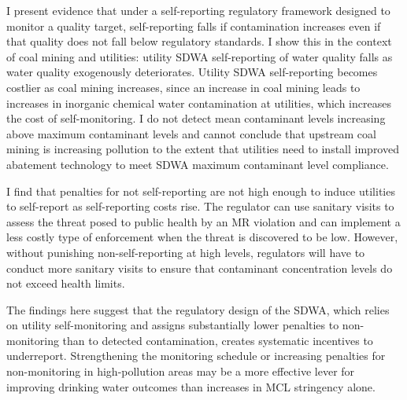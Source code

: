 \documentclass{article}
\begin{document}
I present evidence that under a self-reporting regulatory framework designed to monitor a quality target, self-reporting falls if contamination increases even if that quality does not fall below regulatory standards. I show this in the context of coal mining and utilities: utility SDWA self-reporting of water quality falls as water quality exogenously deteriorates. Utility SDWA self-reporting becomes costlier as coal mining increases, since an increase in coal mining leads to increases in inorganic chemical water contamination at utilities, which increases the cost of self-monitoring. I do not detect mean contaminant levels increasing above maximum contaminant levels and cannot conclude that upstream coal mining is increasing pollution to the extent that utilities need to install improved abatement technology to meet SDWA maximum contaminant level compliance. 

I find that penalties for not self-reporting are not high enough to induce utilities to self-report as self-reporting costs rise. The regulator can use sanitary visits to assess the threat posed to public health by an MR violation and can implement a less costly type of enforcement when the threat is discovered to be low. However, without punishing non-self-reporting at high levels, regulators will have to conduct more sanitary visits to ensure that contaminant concentration levels do not exceed health limits.

The findings here suggest that the regulatory design of the SDWA, which relies on utility self-monitoring and assigns substantially lower penalties to non-monitoring than to detected contamination, creates systematic incentives to underreport. Strengthening the monitoring schedule or increasing penalties for non-monitoring in high-pollution areas may be a more effective lever for improving drinking water outcomes than increases in MCL stringency alone.

\newpage



%

%
\end{document}

